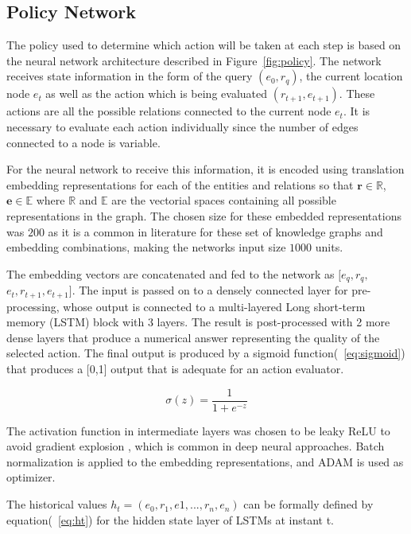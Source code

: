 \subsection{Policy Network}
\label{sec:policy}

The policy used to determine which action will be taken at each step is based on the neural network architecture described in Figure~\ref{fig:policy}. The network receives state information in the form of the query $(e_0,r_q)$, the current location node $e_t$ as well as the action which is being evaluated $(r_{t+1}, e_{t+1})$. These actions are all the possible relations connected to the current node $e_t$. It is necessary to evaluate each action individually since the number of edges connected to a node is variable.

For the neural network to receive this information, it is encoded using translation embedding representations for each of the entities and relations so that  $\textbf{r} \in \mathbb{R}$, $\textbf{e} \in \mathbb{E}$ where $\mathbb{R}$ and $\mathbb{E}$ are the vectorial spaces containing all possible representations in the graph. The chosen size for these embedded representations was $200$ as it is a common in literature for these set of knowledge graphs and embedding combinations, making the networks input size $1000$ units.

The embedding vectors are concatenated and fed to the network as $[e_q,r_q,$ \\$e_t,r_{t+1},e_{t+1}]$. The input is passed on to a densely connected layer for pre-processing, whose output is connected to a multi-layered Long short-term memory (LSTM)
 block with 3 layers. The result is post-processed with 2 more dense layers that produce a numerical answer representing the quality of the selected action. The final output is produced by a sigmoid function(~\ref{eq:sigmoid}) that produces a [0,1] output that is adequate for an action evaluator.

\begin{equation}
\label{eq:sigmoid}
    \sigma(z) = \frac{1} {1 + e^{-z}}
\end{equation}

The activation function in intermediate layers was chosen to be leaky ReLU to avoid gradient explosion
, which is common in deep neural approaches. Batch normalization is applied to the embedding representations, and ADAM
is used as optimizer. 

The historical values $h_t = (e_0,r_1,e1,...,r_n,e_n)$ can be formally defined by equation(~\ref{eq:ht}) for the hidden state layer of LSTMs at instant t.


